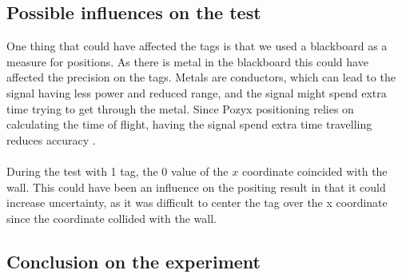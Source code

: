 \subsection{Possible influences on the test}
One thing that could have affected the tags is that we used a blackboard as a measure for positions. 
As there is metal in the blackboard this could have affected the precision on the tags.
Metals are conductors, which can lead to the signal having less power and reduced range, and the signal might spend extra time trying to get through the metal.
Since Pozyx positioning relies on calculating the time of flight, having the signal spend extra time travelling reduces accuracy \cite{pozyx-UWBObstacles}. 
\\\\
During the test with 1 tag, the 0 value of the $x$ coordinate coincided with the wall. 
This could have been an influence on the positing result in that it could increase uncertainty, as it was difficult to center the tag over the x coordinate since the coordinate collided with the wall.

\subsection{Conclusion on the experiment}